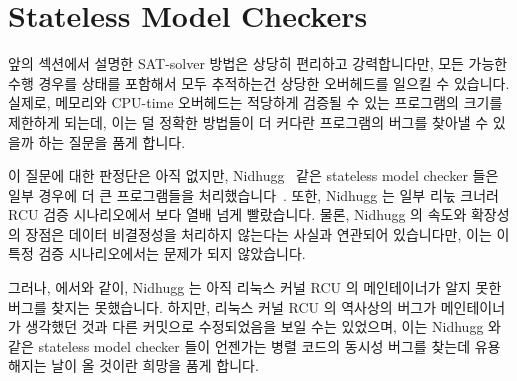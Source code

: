 
\section{Stateless Model Checkers}
\label{sec:formal:Stateless Model Checkers}

앞의 섹션에서 설명한 SAT-solver 방법은 상당히 편리하고 강력합니다만, 모든
가능한 수행 경우를 상태를 포함해서 모두 추적하는건 상당한 오버헤드를 일으킬 수
있습니다.
실제로, 메모리와 CPU-time 오버헤드는 적당하게 검증될 수 있는 프로그램의 크기를
제한하게 되는데, 이는 덜 정확한 방법들이 더 커다란 프로그램의 버그를 찾아낼 수
있을까 하는 질문을 품게 합니다.

이 질문에 대한 판정단은 아직 없지만, Nidhugg~\cite{CarlLeonardsson2014Nidhugg}
같은 stateless model checker 들은 일부 경우에 더 큰 프로그램들을
처리했습니다~\cite{SMC-TreeRCU}.
또한, Nidhugg 는 일부 리눇 크너러 RCU 검증 시나리오에서  보다 열배
넘게 빨랐습니다.
물론, Nidhugg 의 속도와 확장성의 장점은 데이터 비결정성을 처리하지 않는다는
사실과 연관되어 있습니다만, 이는 이 특정 검증 시나리오에서는 문제가 되지
않았습니다.
\iffalse

The SAT-solver approaches described in the previous section are quite
convenient and powerful, but the full tracking of all possible
executions, including state, can incur substantial overhead.
In fact, the memory and CPU-time overheads can sharply limit the size
of programs that can be feasibly verified, which raises the question
of whether less-exact approaches might find bugs in larger programs.

Although the jury is still out on this question, stateless model
checkers such as Nidhugg~\cite{CarlLeonardsson2014Nidhugg} have in
some cases handled larger programs~\cite{SMC-TreeRCU}.
In addition, Nidhugg was more than an order of magnitude faster than
was \co{cbmc} for some Linux-kernel RCU verification scenarios.
Of course, Nidhugg's speed and scalability advantages are tied to
the fact that it does not handle data non-determinism, but this
was not a factor in these particular verification scenarios.
\fi

그러나,  에서와 같이, Nidhugg 는 아직 리눅스 커널 RCU 의 메인테이너가
알지 못한 버그를 찾지는 못했습니다.
하지만, 리눅스 커널 RCU 의 역사상의 버그가 메인테이너가 생각했던 것과 다른
커밋으로 수정되었음을 보일 수는 있었으며, 이는 Nidhugg 와 같은 stateless model
checker 들이 언젠가는 병렬 코드의 동시성 버그를 찾는데 유용해지는 날이 올
것이란 희망을 품게 합니다.
\iffalse

Nevertheless, as with \co{cbmc}, Nidhugg has not yet been able to
locate a bug that Linux-kernel RCU's maintainer was not already
aware of.
However, it was able to demonstrate that one historical bug in
Linux-kernel RCU was fixed by a different commit than the maintainer
thought, which gives some additional hope that stateless model checkers
like Nidhugg might someday be useful for finding concurrency bugs in
parallel code.
\fi
